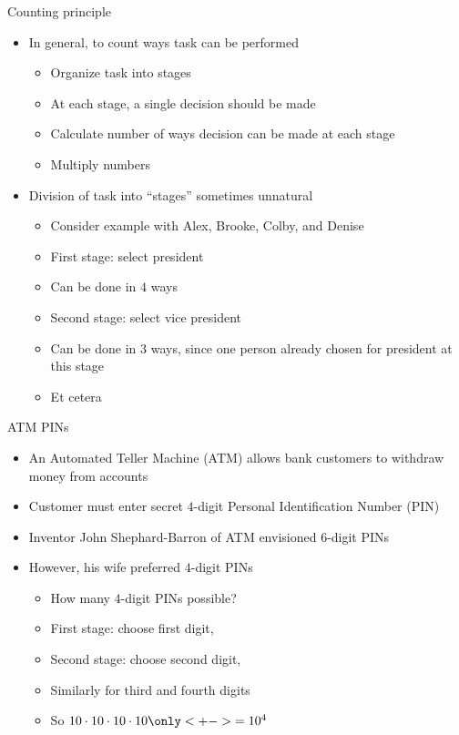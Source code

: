 \documentclass{beamer}
\theoremstyle{definition}
\begin{document}
\begin{frame}{Counting principle}
\begin{itemize}
\item In general, to count ways task can be performed
\begin{itemize}
\item Organize task into stages
\item At each stage, a single decision should be made
\item Calculate number of ways decision can
be made at each stage
\item Multiply numbers
\end{itemize}
\item Division of task into ``stages'' sometimes unnatural
\begin{example}
\begin{itemize}
\item Consider example with Alex, Brooke, Colby, and Denise
\item First stage: select president
\item Can be done in $4$ ways
\item Second stage: select vice president
\item Can be done in $3$ ways, since one person already
chosen for president at this stage
\item Et cetera
\end{itemize}
\end{example}
\end{itemize}
\end{frame}

\begin{frame}{ATM PINs}
\begin{itemize}
\item An Automated Teller Machine (ATM)
allows bank customers to withdraw money from accounts
\item Customer must enter secret $4$-digit
Personal Identification Number (PIN)
\item Inventor John Shephard-Barron of ATM envisioned $6$-digit PINs
\item However, his wife preferred $4$-digit PINs
\begin{example}
\begin{itemize}
\item How many $4$-digit PINs possible?
\item First stage: choose first digit, 
\item Second stage: choose second digit, 
\item Similarly for third and fourth digits
\item So $10\cdot 10\cdot 10\cdot 10\only<+->{=10^4}$
\end{itemize}
\end{example}
\end{itemize}
\end{frame}
\end{document}
